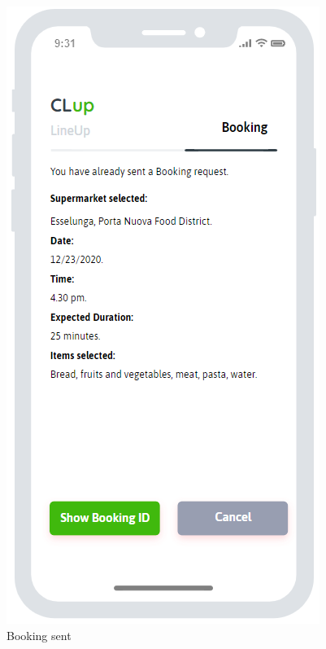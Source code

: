 \begin{figure}[H]
\begin{minipage}{0.3\linewidth}
\includegraphics[width=\textwidth]{./Images/MockupLogo/mockBookSent}
\caption{Booking sent}
\end{minipage}
\end{figure}
